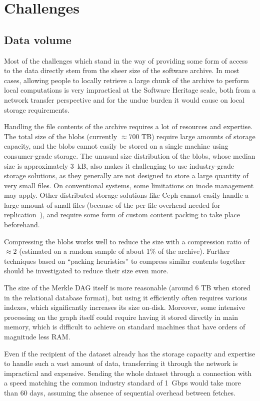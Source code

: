 \section{Challenges}

\subsection{Data volume}

Most of the challenges which stand in the way of providing some form of access
to the data directly stem from the sheer size of the software archive. In most
cases, allowing people to locally retrieve a large chunk of the archive to
perform local computations is very impractical at the Software Heritage scale,
both from a network transfer perspective and for the undue burden it would
cause on local storage requirements.

Handling the file contents of the archive requires a lot of resources and
expertise. The total size of the blobs (currently $\approx 700$ TB) require
large amounts of storage capacity, and the blobs cannot easily be stored on a
single machine using consumer-grade storage. The unusual size distribution of
the blobs, whose median size is approximately 3~kB, also makes it challenging
to use industry-grade storage solutions, as they generally are not designed to
store a large quantity of very small files. On conventional systems, some
limitations on inode management may apply. Other distributed storage solutions
like Ceph cannot easily handle a large amount of small files (because of the
per-file overhead needed for replication~\cite{dandrimont2018cephml}), and
require some form of custom content packing to take place beforehand.

Compressing the blobs works well to reduce the size with a compression
ratio of $\approx 2$ (estimated on a random sample of about 1\% of the
archive). Further techniques based on ``packing heuristics'' to compress
similar contents together should be investigated to reduce their size even
more.

The size of the Merkle DAG itself is more reasonable (around 6 TB when stored
in the relational database format), but using it efficiently often requires
various indexes, which significantly increases its size on-disk.  Moreover,
some intensive processing on the graph itself could require having it stored
directly in main memory, which is difficult to achieve on standard machines
that have orders of magnitude less RAM.\@

Even if the recipient of the dataset already has the storage capacity and
expertise to handle such a vast amount of data, transferring it through the
network is impractical and expensive. Sending the whole dataset through a
connection with a speed matching the common industry standard of 1~Gbps would
take more than 60 days, assuming the absence of sequential overhead between
fetches.


